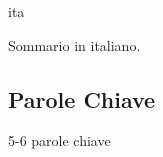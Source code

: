 \markboth{\abstractname}{}
\begin{scontents}[store-env=lang]
ita
\end{scontents}
\begin{scontents}[store-env=abstracts,print-env=true]
Sommario in italiano.
\end{scontents}
\subsection*{Parole Chiave}
\begin{scontents}[store-env=keywords,print-env=true]
5-6 parole chiave
\end{scontents}